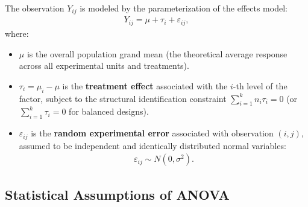 The observation $Y_{ij}$ is modeled by the parameterization of the effects model:
\begin{align}
	Y_{ij} = \mu + \tau_i + \varepsilon_{ij},
\label{eq:modelo_anova1}
\end{align}
where:
\begin{itemize}
	\item $\mu$ is the overall population grand mean (the theoretical average response across all experimental units and treatments).
	\item $\tau_i = \mu_i - \mu$ is the \textbf{treatment effect} associated with the $i$-th level of the factor, subject to the structural identification constraint $\sum_{i=1}^k n_i \tau_i = 0$ (or $\sum_{i=1}^k \tau_i = 0$ for balanced designs).
	\item $\varepsilon_{ij}$ is the \textbf{random experimental error} associated with observation $(i,j)$, assumed to be independent and identically distributed normal variables:
	\begin{align}
		\varepsilon_{ij} \sim N(0, \sigma^2).
	\end{align}
\end{itemize}

\subsection{Statistical Assumptions of ANOVA}

